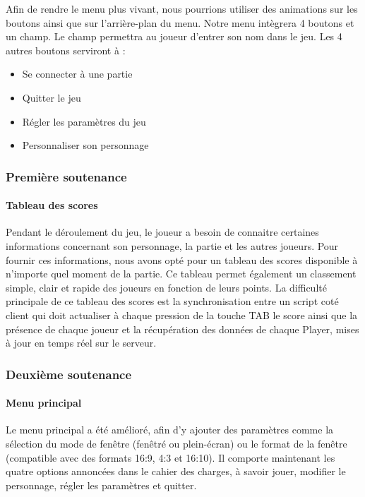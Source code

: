         Afin de rendre le menu plus vivant, 
        nous pourrions utiliser des animations sur les boutons ainsi que sur l’arrière-plan du menu. 
        Notre menu intègrera 4 boutons et un champ. Le champ permettra au joueur d’entrer son nom dans le jeu.
        Les 4 autres boutons serviront à :
        \begin{itemize}
                \item Se connecter à une partie
                \item Quitter le jeu
                \item Régler les paramètres du jeu
                \item Personnaliser son personnage
        \end{itemize}


    \subsubsection{Première soutenance}
        
        \paragraph{Tableau des scores}

            Pendant le déroulement du jeu, le joueur a besoin de connaitre certaines informations concernant son personnage, la partie et les autres joueurs. 
            Pour fournir ces informations, nous avons opté pour un tableau des scores disponible à n’importe quel moment de la partie. Ce tableau permet également un classement simple, clair et rapide des joueurs en fonction de leurs points.
            La difficulté principale de ce tableau des scores est la synchronisation entre un script coté client qui doit actualiser à chaque pression de la touche TAB le score ainsi que la présence de chaque joueur et la récupération des données de chaque Player, mises à jour en temps réel sur le serveur.


    \subsubsection{Deuxième soutenance}
    
        \paragraph{Menu principal}
        
            Le menu principal a été amélioré, afin d'y ajouter des paramètres comme la sélection du mode de fenêtre (fenêtré 
            ou plein-écran) ou le format de la fenêtre (compatible avec des formats 16:9, 4:3 et 16:10).
            Il comporte maintenant les quatre options annoncées dans le cahier des charges, à savoir jouer, modifier le personnage, 
            régler les paramètres et quitter.


